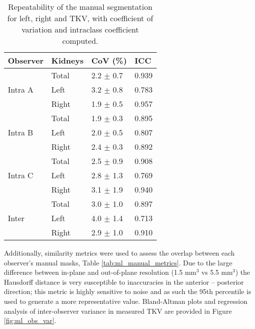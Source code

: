 \begin{table}[H]
	\centering
	\begin{tabular}{ll||l|l}
		Observer                 & Kidneys & CoV (\%)      & ICC   \\ \hline
		\multirow{3}{*}{Intra A} & Total   & 2.2 $\pm$ 0.7 & 0.939 \\ \cline{2-4} 
		& Left    & 3.2 $\pm$ 0.8 & 0.783 \\ \cline{2-4} 
		& Right   & 1.9 $\pm$ 0.5 & 0.957 \\ \hline
		\multirow{3}{*}{Intra B} & Total   & 1.9 $\pm$ 0.3 & 0.895 \\ \cline{2-4} 
		& Left    & 2.0 $\pm$ 0.5 & 0.807 \\ \cline{2-4} 
		& Right   & 2.4 $\pm$ 0.3 & 0.892 \\ \hline
		\multirow{3}{*}{Intra C} & Total   & 2.5 $\pm$ 0.9 & 0.908 \\ \cline{2-4} 
		& Left    & 2.8 $\pm$ 1.3 & 0.769 \\ \cline{2-4} 
		& Right   & 3.1 $\pm$ 1.9 & 0.940 \\ \hline
		\multirow{3}{*}{Inter}   & Total   & 3.0 $\pm$ 1.0 & 0.897 \\ \cline{2-4} 
		& Left    & 4.0 $\pm$ 1.4 & 0.713 \\ \cline{2-4} 
		& Right   & 2.9 $\pm$ 1.0 & 0.910
	\end{tabular}
	\caption{Repeatability of the manual segmentation for left, right and \ac{TKV}, with coefficient of variation and intraclass coefficient computed.}
	\label{tab:ml_manual_repeatability}
\end{table}

Additionally, similarity metrics were used to assess the overlap between each observer’s manual masks, Table \ref{tab:ml_manual_metrics}. Due to the large difference between in-plane and out-of-plane resolution (1.5 mm$^3$ vs 5.5 mm$^3$) the Hausdorff distance is very susceptible to inaccuracies in the anterior – posterior direction; this metric is highly sensitive to noise and as such the 95th percentile is used to generate a more representative value. Bland-Altman plots and regression analysis of inter-observer variance in measured \ac{TKV} are provided in Figure \ref{fig:ml_obs_var}.

